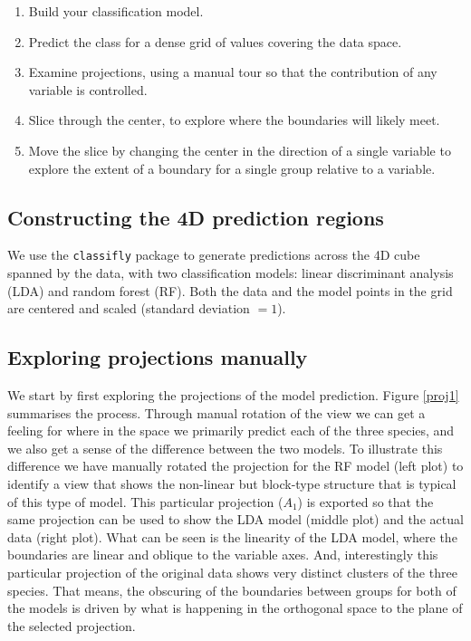 \documentclass[]{interact}
\theoremstyle{plain}%
\theoremstyle{definition}
\theoremstyle{remark}
\providecommand{\tightlist}{%
  \setlength{\itemsep}{0pt}\setlength{\parskip}{0pt}}
\def\tightlist{}
\begin{document}
\begin{enumerate}
\def\labelenumi{\arabic{enumi}.}
\tightlist
\item
  Build your classification model.
\item
  Predict the class for a dense grid of values covering the data space.
\item
  Examine projections, using a manual tour so that the contribution of
  any variable is controlled.
\item
  Slice through the center, to explore where the boundaries will likely
  meet.
\item
  Move the slice by changing the center in the direction of a single
  variable to explore the extent of a boundary for a single group
  relative to a variable.
\end{enumerate}

\hypertarget{constructing-the-4d-prediction-regions}{%
\subsection{Constructing the 4D prediction
regions}\label{constructing-the-4d-prediction-regions}}

We use the \texttt{classifly} package \citep{classifly} to generate
predictions across the 4D cube spanned by the data, with two
classification models: linear discriminant analysis (LDA) and random
forest (RF). Both the data and the model points in the grid are centered
and scaled (standard deviation \(= 1\)).

\hypertarget{exploring-projections-manually}{%
\subsection{Exploring projections
manually}\label{exploring-projections-manually}}

We start by first exploring the projections of the model prediction.
Figure \ref{proj1} summarises the process. Through manual rotation of
the view we can get a feeling for where in the space we primarily
predict each of the three species, and we also get a sense of the
difference between the two models. To illustrate this difference we have
manually rotated the projection for the RF model (left plot) to identify
a view that shows the non-linear but block-type structure that is
typical of this type of model. This particular projection (\(A_1\)) is
exported so that the same projection can be used to show the LDA model
(middle plot) and the actual data (right plot). What can be seen is the
linearity of the LDA model, where the boundaries are linear and oblique
to the variable axes. And, interestingly this particular projection of
the original data shows very distinct clusters of the three species.
That means, the obscuring of the boundaries between groups for both of
the models is driven by what is happening in the orthogonal space to the
plane of the selected projection.
\end{document}
